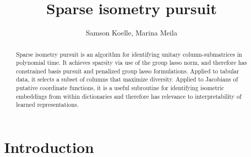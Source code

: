 \documentclass[a4paper,11pt]{article}
\begin{document}
\title{Sparse isometry pursuit}
\author{Samson Koelle, Marina Meila}

\maketitle

\begin{abstract}

Sparse isometry pursuit is an algorithm for identifying unitary column-submatrices in polynomial time.
It achieves sparsity via use of the group lasso norm, and therefore has constrained basis pursuit and penalized group lasso formulations.
Applied to tabular data, it selects a subset of columns that maximize diversity.
Applied to Jacobians of putative coordinate functions, it is a useful subroutine for identifying isometric embeddings from within dictionaries and therefore has relevance to interpretability of learned representations.


\end{abstract}

\section{Introduction}

\end{document}
